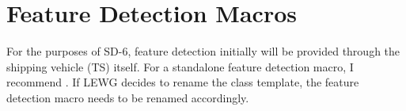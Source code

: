 \section{Feature Detection Macros}\label{sec:feature-detection}

For the purposes of SD-6, feature detection initially will be provided through the shipping vehicle (TS) itself.
For a standalone feature detection macro, I recommend .
If LEWG decides to rename the \simd class template, the feature detection macro needs to be renamed accordingly.

